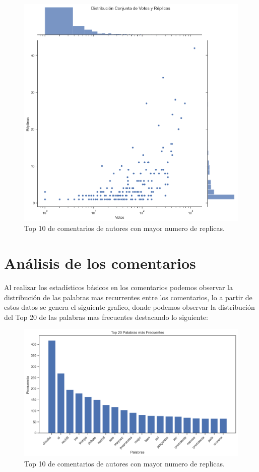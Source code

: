 \begin{figure}[!h]
	\centering
	\includegraphics[width=15cm]{../Datos/DistribucionVotosVsReplicas}
	\caption{Top 10 de comentarios de autores con mayor numero de replicas.}
	\label{fig:DVVR}
\end{figure}

\chapter{Análisis de los comentarios}

Al realizar los estadísticos básicos en los comentarios podemos observar la distribución de las palabras mas recurrentes entre los comentarios, lo a partir de estos datos se genera el siguiente grafico, donde podemos observar la distribución del Top 20 de las palabras mas frecuentes destacando lo siguiente:\\

\begin{figure}[!h]
	\centering
	\includegraphics[width=16cm]{../Datos/top20palabrasMasFrecuentes}
	\caption{Top 10 de comentarios de autores con mayor numero de replicas.}
	\label{fig:Top20PMF}
\end{figure}

